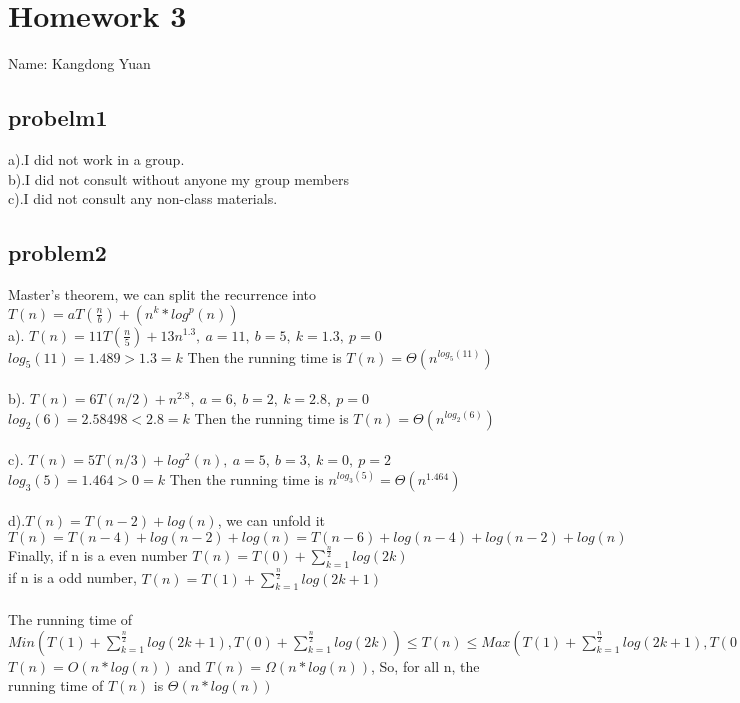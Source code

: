 \documentclass[11pt]{article}
\begin{document}
\section{Homework 3}
Name: Kangdong Yuan
	
\subsection{probelm1}
a).I did not work in a group.
\\b).I did not consult without anyone my group members
\\c).I did not consult any non-class materials.

\subsection{problem2}
Master’s theorem, we can split the recurrence into $T(n)=aT(\frac{n}{b})+(n^k*log^p(n))$ \\
a). $T(n)=11T(\frac{n}{5})+13n^{1.3}, \ a=11, \ b=5, \ k=1.3, \ p=0$\\
$log_{5}(11)=1.489>1.3=k$ Then the running time is $ T(n)=\Theta(n^{log_{5}(11)})$ \\
\\
b). $T(n)=6T(n/2)+n^{2.8}, \ a=6, \ b=2, \ k=2.8, \ p=0$\\
$log_{2}(6)=2.58498<2.8=k$ Then the running time is $ T(n)=\Theta(n^{log_{2}(6)})$ \\
\\
c). $T(n)=5T(n/3)+log^2(n), \ a=5, \ b=3, \ k=0, \ p=2$\\
$log_{3}(5)=1.464>0=k$ Then the running time is $ n^{log_{3}(5)}=\Theta(n^{1.464})$ \\
\\
d).$T(n)=T(n-2)+log(n)$, we can unfold it $T(n)=T(n-4)+log(n-2)+log(n)=T(n-6)+log(n-4)+log(n-2)+log(n)$ \\ Finally, if n is a even number $ T\left(n\right)=T\left(0\right)+\sum _{k=1}^{\frac{n}{2}}log\left(2k\right)$ \\
if n is a odd number, $T\left(n\right)=T\left(1\right)+\sum _{k=1}^{\frac{n}{2}}log\left(2k+1\right)$ \\
\\ The running time of \\ $Min (T\left(1\right)+\sum _{k=1}^{\frac{n}{2}}log\left(2k+1\right),T\left(0\right)+\sum _{k=1}^{\frac{n}{2}}log\left(2k\right) )  \leq T(n) \leq Max(T\left(1\right)+\sum _{k=1}^{\frac{n}{2}}log\left(2k+1\right),T\left(0\right)+\sum _{k=1}^{\frac{n}{2}}log\left(2k\right))$ \\
$T(n)=O(n*log(n))$ and $T(n)=\Omega(n*log(n))$,  
So, for all n, the running time of $T(n)$ is $\Theta(n*log(n))$
\end{document}
